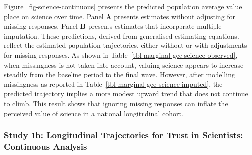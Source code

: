 \documentclass[
  single column]{article}
\begin{document}
\begin{table}

\caption{\label{tbl-marginal-gee-science-imputed}Predicted population
average value placed on science over time, adjusting for missing data.}


\end{table}%

Figure~\ref{fig-science-continuous} presents the predicted population
average value place on science over time. Panel \textbf{A} presents
estimates without adjusting for missing responses. Panel \textbf{B}
presents estimates that incorporate multiple imputation. These
predictions, derived from generalised estimating equations, reflect the
estimated population trajectories, either without or with adjustments
for missing responses. As shown in
Table~\ref{tbl-marginal-gee-science-observed}, when missingness is not
taken into account, valuing science appears to increase steadily from
the baseline period to the final wave. However, after modelling
missingness as reported in Table~\ref{tbl-marginal-gee-science-imputed},
the predicted trajectory implies a more modest upward trend that does
not continue to climb. This result shows that ignoring missing responses
can inflate the perceived value of science in a national longitudinal
cohort.

\newpage{}

\subsubsection{Study 1b: Longitudinal Trajectories for Trust in
Scientists: Continuous
Analysis}\label{study-1b-longitudinal-trajectories-for-trust-in-scientists-continuous-analysis}
\end{document}
